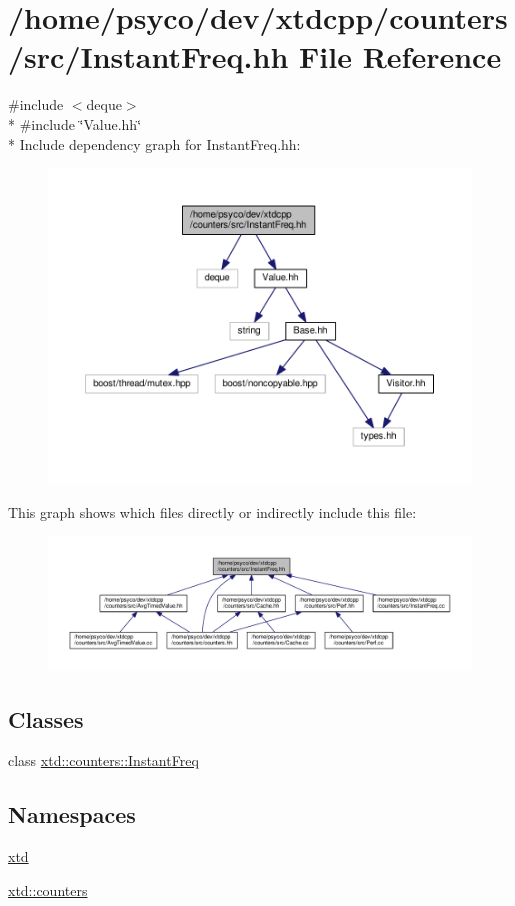 \hypertarget{InstantFreq_8hh}{}\section{/home/psyco/dev/xtdcpp/counters/src/\+Instant\+Freq.hh File Reference}
\label{InstantFreq_8hh}
{\ttfamily \#include $<$deque$>$}\\*
{\ttfamily \#include \char`\"{}Value.\+hh\char`\"{}}\\*
Include dependency graph for Instant\+Freq.\+hh\+:
\nopagebreak
\begin{figure}[H]
\begin{center}
\leavevmode
\includegraphics[width=350pt]{InstantFreq_8hh__incl}
\end{center}
\end{figure}
This graph shows which files directly or indirectly include this file\+:
\nopagebreak
\begin{figure}[H]
\begin{center}
\leavevmode
\includegraphics[width=350pt]{InstantFreq_8hh__dep__incl}
\end{center}
\end{figure}
\subsection*{Classes}
\begin{DoxyCompactItemize}
\item 
class \hyperlink{classxtd_1_1counters_1_1InstantFreq}{xtd\+::counters\+::\+Instant\+Freq}
\end{DoxyCompactItemize}
\subsection*{Namespaces}
\begin{DoxyCompactItemize}
\item 
 \hyperlink{namespacextd}{xtd}
\item 
 \hyperlink{namespacextd_1_1counters}{xtd\+::counters}
\end{DoxyCompactItemize}
